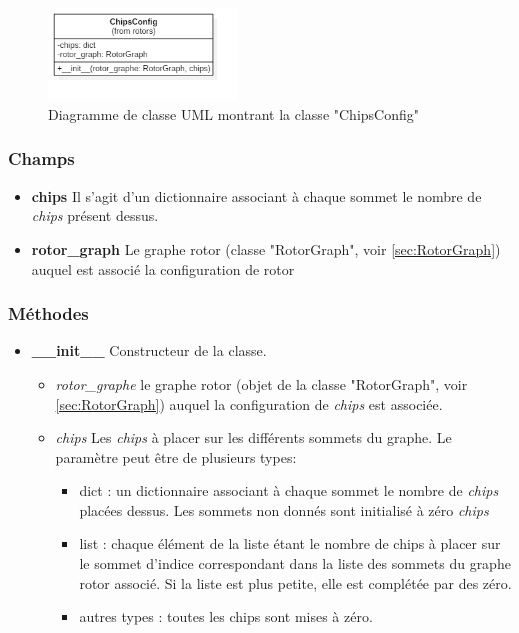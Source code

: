 \documentclass{article}
\begin{document}
	\begin{figure}[h]
		\includegraphics[width=5cm]{diagClassChipsConfig.png}
		\centering
		\caption{Diagramme de classe UML montrant la classe "ChipsConfig"}
		\label{fig:diagClassChipsConfig}
	\end{figure}

	\subsubsection{Champs}
	\begin{itemize}
		\item \textbf{chips}\newline
		Il s'agit d'un dictionnaire associant à chaque sommet le nombre de \textit{chips} présent dessus.
		\item \textbf{rotor\_graph}\newline
		Le graphe rotor (classe "RotorGraph", voir \ref{sec:RotorGraph}) auquel est associé la configuration de rotor
	\end{itemize}

	\subsubsection{Méthodes}
	\begin{itemize}
		\item \textbf{\_\_init\_\_}\newline
		Constructeur de la classe.
		\begin{itemize}
			\item \textit{rotor\_graphe}\newline
			le graphe rotor (objet de la classe "RotorGraph", voir \ref{sec:RotorGraph}) auquel la configuration de \textit{chips} est associée.
			\item \textit{chips}\newline
			Les \textit{chips} à placer sur les différents sommets du graphe. Le paramètre peut être de plusieurs types:
			\begin{itemize}
				\item dict : un dictionnaire associant à chaque sommet le nombre de \textit{chips} placées dessus. Les sommets non donnés sont initialisé à zéro \textit{chips}
				\item list : chaque élément de la liste étant le nombre de chips à placer sur le sommet d'indice correspondant dans la liste des sommets du graphe rotor associé. Si la liste est plus petite, elle est complétée par des zéro.
				\item autres types : toutes les chips sont mises à zéro.
			\end{itemize}
		\end{itemize}
	\end{itemize}
	
\end{document}
